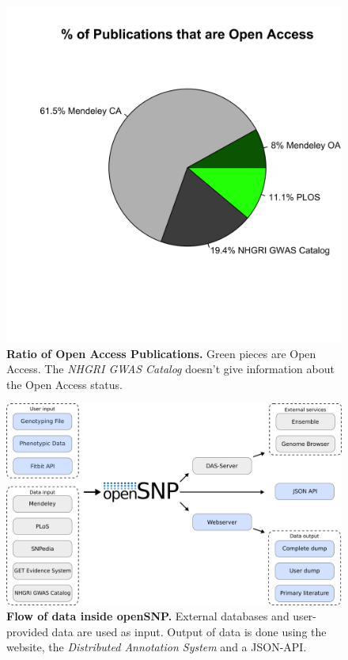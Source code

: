\documentclass[10pt]{article}
\begin{document}
\begin{figure}[!ht]
	\begin{center}
		\includegraphics[scale=0.1]{25_10_2012_Graphs/percent_oa.png}
	\end{center}
	\caption{
	{\bf Ratio of Open Access Publications.} Green pieces are Open Access. The \emph{NHGRI GWAS Catalog} doesn't give information about the Open Access status.}
	\label{oa_label}
\end{figure}

\begin{figure}[!ht]
	\begin{center}
	  \includegraphics[scale=0.3]{latest_uml.png}
	\end{center}
	\caption{
	{\bf Flow of data inside openSNP.} External databases and user-provided data are used as input. Output of data is done using the website, the \emph{Distributed Annotation System} and a JSON-API.} 
	\label{Figure4_label}
\end{figure}
\end{document}

